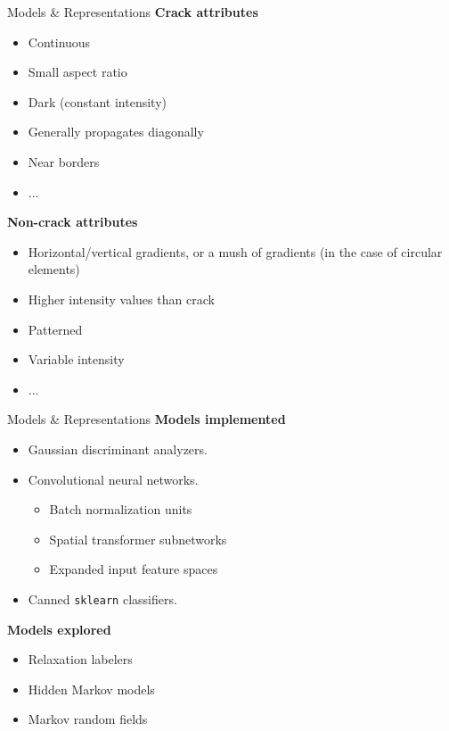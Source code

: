 \documentclass[10pt]{beamer}
\begin{document}
\begin{frame}{Models \& Representations}
	\textbf{Crack attributes}
	\begin{itemize}
		\item Continuous
		\item Small aspect ratio
		\item Dark (constant intensity)
		\item Generally propagates diagonally
		\item Near borders
		\item ...
	\end{itemize}
	
	\textbf{Non-crack attributes}
	\begin{itemize}
		\item Horizontal/vertical gradients, or a mush of gradients (in the case of circular elements)
		\item Higher intensity values than crack
		\item Patterned
		\item Variable intensity
		\item ...
	\end{itemize}
\end{frame}

\begin{frame}{Models \& Representations}
	\textbf{Models implemented}
	\begin{itemize}
		\item Gaussian discriminant analyzers.
		\item Convolutional neural networks.
			\begin{itemize}
				\item Batch normalization units
				\item Spatial transformer subnetworks
				\item Expanded input feature spaces
			\end{itemize}
		\item Canned \texttt{sklearn} classifiers.
	\end{itemize}
	
	\textbf{Models explored}
	\begin{itemize}
		\item Relaxation labelers
		\item Hidden Markov models
		\item Markov random fields
	\end{itemize}
\end{frame}
\end{document}
